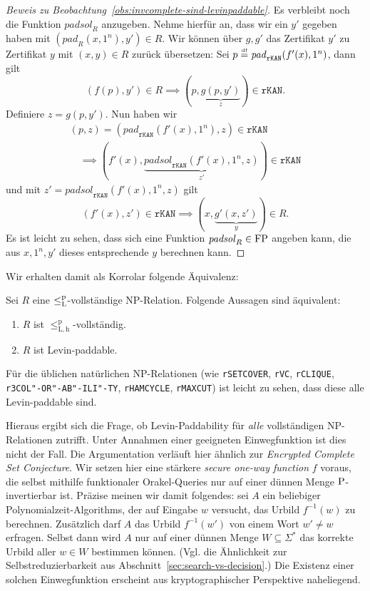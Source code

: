 \begin{proof}[Beweis zu Beobachtung~\ref{obs:invcomplete-sind-levinpaddable}]
    Es verbleibt noch die Funktion $\mathit{padsol}_R$ anzugeben. Nehme hierfür an, dass wir ein $y'$ gegeben haben mit $(\mathit{pad}_R(x, 1^n), y')\in R$.
    Wir können über $g, g'$ das Zertifikat $y'$ zu Zertifikat $y$ mit $(x, y)\in R$ zurück übersetzen:
    Sei $p\defeq \mathit{pad}_\mathtt{rKAN}(f'(x), 1^n)$, dann gilt
    \[ (f(p), y')\in R \implies (p, \underbrace{g(p, y')}_z)\in \mathtt{rKAN}. \]
    Definiere $z=g(p, y')$.
    Nun haben wir
    \begin{gather*} (p, z)=(\mathit{pad}_\mathtt{rKAN}(f'(x), 1^n), z)\in\mathtt{rKAN}  \\\quad\implies (f'(x), \underbrace{\mathit{padsol}_\mathtt{rKAN}(f'(x), 1^n, z)}_{z'})\in\mathtt{rKAN} \end{gather*}
    und mit $z'=\mathit{padsol}_\mathtt{rKAN}(f'(x), 1^n, z)$ gilt
    \[ (f'(x), z') \in \mathtt{rKAN} \implies (x, \underbrace{g'(x, z')}_{y}) \in R. \]
    Es ist leicht zu sehen, dass sich eine Funktion $\mathit{padsol}_R\in\FP$ angeben kann, die aus $x, 1^n, y'$ dieses entsprechende $y$ berechnen kann.
\end{proof}

Wir erhalten damit als Korrolar folgende Äquivalenz:
\begin{corollary}\label{cor:leqlhp-is-paddable}
    Sei $R$ eine $\leqlp$-vollständige NP-Relation. Folgende Aussagen sind äquivalent:
    \begin{enumerate}
        \item $R$ ist $\leq_\mathrm{L,h}^\mathrm p$-vollständig.
        \item $R$ ist Levin-paddable.
    \end{enumerate}
\end{corollary}

Für die üblichen natürlichen NP-Relationen (wie \texttt{rSETCOVER}, \texttt{rVC}, \texttt{rCLIQUE}, \texttt{r3COL"-OR"-AB"-ILI"-TY}, \texttt{rHAMCYCLE}, \texttt{rMAXCUT}) ist leicht zu sehen, dass diese alle Levin-paddable sind. 

Hieraus ergibt sich die Frage, ob Levin-Paddability für \emph{alle} vollständigen NP-Relationen zutrifft. Unter Annahmen einer geeigneten Einwegfunktion ist dies nicht der Fall.
Die Argumentation verläuft hier ähnlich zur \emph{Encrypted Complete Set Conjecture}.
Wir setzen hier eine stärkere \emph{secure one-way function} \parencite{grollmann_complexity_1988} $f$ voraus, die selbst mithilfe funktionaler Orakel-Queries nur auf einer dünnen Menge $\P$-invertierbar ist.
Präzise meinen wir damit folgendes: sei $A$ ein beliebiger Polynomialzeit-Algorithms, der auf Eingabe $w$ versucht, das Urbild $f^{-1}(w)$ zu berechnen. Zusätzlich darf $A$ das Urbild $f^{-1}(w')$ von einem Wort $w'\neq w$ erfragen. Selbst dann wird $A$ nur auf einer dünnen Menge $W\subseteq\Sigma^*$ das korrekte Urbild aller $w\in W$ bestimmen können.
(Vgl. die Ähnlichkeit zur Selbstreduzierbarkeit aus Abschnitt~\ref{sec:search-vs-decision}.)
Die Existenz einer solchen Einwegfunktion erscheint aus kryptographischer Perspektive naheliegend.


